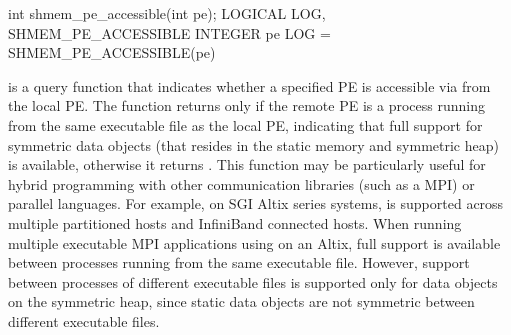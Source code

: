\synC     
int shmem_pe_accessible(int pe); %
\synF
LOGICAL LOG, SHMEM_PE_ACCESSIBLE
INTEGER pe
LOG = SHMEM_PE_ACCESSIBLE(pe) %

{
        is  a  query function  that indicates  whether  a
       specified \ac{PE} is accessible via \openshmem from the local \ac{PE}. The  function returns  only if  the  remote  \ac{PE} is a process  running from the same executable  file as the local \ac{PE}, indicating that full \openshmem support for symmetric data objects (that resides in the static memory and symmetric heap) is available, otherwise it returns .  This function may be \cbstart particularly \cbend useful for hybrid programming with other communication libraries (such as a \ac{MPI}) or parallel languages.  For example, on  SGI Altix  series  systems, \openshmem is  supported  across multiple partitioned hosts and InfiniBand connected hosts. When running multiple executable MPI applications using \openshmem on an Altix, full \openshmem support is available between processes running from the same executable file. However, \openshmem support between processes of different executable  files  is  supported only for data objects on the symmetric heap, since static data objects are  not symmetric  between  different executable  files.        
}
{
}

\eAPI
